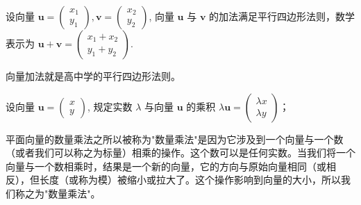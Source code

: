 \begin{definition}[平面向量的加法]
  设向量 $\boldsymbol{u}=\left(\begin{array}{l}x_1 \\ y_1\end{array}\right), \boldsymbol{v}=\left(\begin{array}{l}x_2 \\ y_2\end{array}\right)$, 
  向量 $\boldsymbol{u}$ 与 $\boldsymbol{v}$ 的加法满足平行四边形法则，数学表示为 $\boldsymbol{u}+\boldsymbol{v}=\left(\begin{array}{l}x_1+x_2 \\ y_1+y_2\end{array}\right)$.
\end{definition}

\begin{note}
向量加法就是高中学的平行四边形法则。
\end{note}

\begin{definition}[平面向量的数量乘法]
  设向量 $\boldsymbol{u}=\left(\begin{array}{l}x \\ y\end{array}\right)$, 
  规定实数 $\lambda$ 与向量 $\boldsymbol{u}$ 的乘积 $\lambda \boldsymbol{u}=\left(\begin{array}{l}\lambda x \\ \lambda y\end{array}\right)$；
\end{definition}

平面向量的数量乘法之所以被称为"数量乘法"是因为它涉及到一个向量与一个数（或者我们可以称之为标量）相乘的操作。这个数可以是任何实数。当我们将一个向量与一个数相乘时，结果是一个新的向量，它的方向与原始向量相同（或相反），但长度（或称为模）被缩小或拉大了。这个操作影响到向量的大小，所以我们称之为"数量乘法"。



